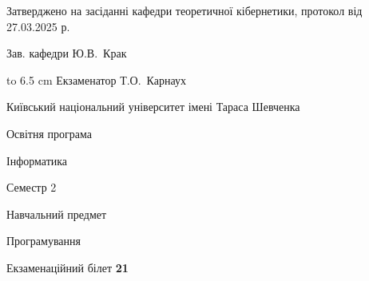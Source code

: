 \documentclass[12pt, ukrainian]{article}
\begin{document}
{\smallskip\smallskip \begin {scriptsize} Затверджено на засіданні кафедри теоретичної кібернетики, протокол   від   27.03.2025 р.\par\smallskip\smallskip\smallskip\smallskip
{\parbox {6.5 cm} {Зав. кафедри \dotfill Ю.В.~Крак}}\hspace {0.7cm} {\hbox to 6.5 cm { Екзаменатор \dotfill Т.О.~Карнаух}} \end{scriptsize}}
\newpage
{{\begin {scriptsize}\par
{ \center  Київський національний університет імені Тараса Шевченка \par}
{\parbox {5 cm}{Освітня програма \hfill}{\parbox {7 cm}{Інформатика\hfill}}\parbox {6 cm}{\hfill Семестр 2}}\par
{\parbox {5 cm} {Навчальний предмет \hfill}\parbox {7 cm}{Програмування \hfill}\parbox {6cm}{\hfill}\par}\vspace{-15pt} \end{scriptsize}}{\center Екзаменаційний білет \No \textbf { 21 }\par}}
\end{document}
